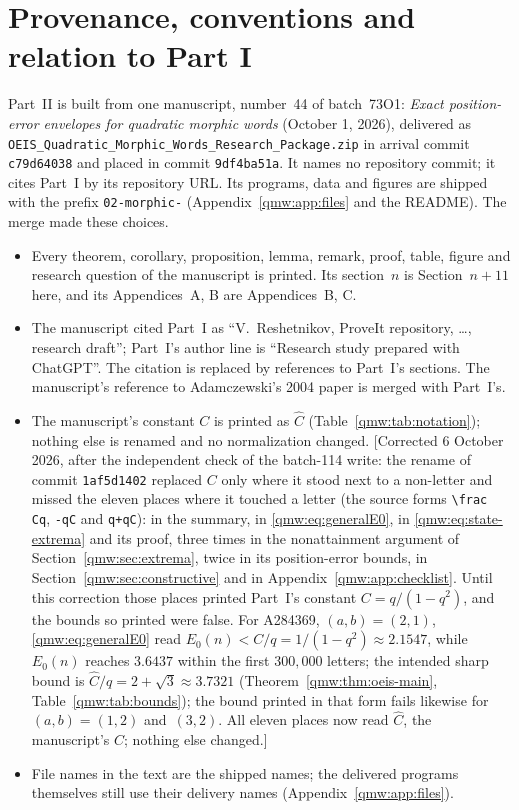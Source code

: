 \documentclass[11pt]{article}
\numberwithin{equation}{section}
\theoremstyle{definition}
\theoremstyle{remark}
\begin{document}
\section{Provenance, conventions and relation to Part I}
\label{qmw:sec:provenance}
Part~II is built from one manuscript, number~44 of batch~73O1:
\emph{Exact position-error envelopes for quadratic morphic words}
(October 1, 2026), delivered as
\texttt{OEIS\_\allowbreak Quadratic\_\allowbreak Morphic\_\allowbreak Words\_\allowbreak Research\_\allowbreak Package.zip} in arrival
commit \texttt{c79d64038} and placed in commit \texttt{9df4ba51a}. It names
no repository commit; it cites Part~I by its repository URL. Its programs,
data and figures are shipped with the prefix \texttt{02-morphic-}
(Appendix~\ref{qmw:app:files} and the README). The merge made these choices.
\begin{itemize}[leftmargin=*,itemsep=1pt]
\item Every theorem, corollary, proposition, lemma, remark, proof, table,
figure and research question of the manuscript is printed. Its section~$n$
is Section~$n+11$ here, and its Appendices~A, B are Appendices~B, C.
\item The manuscript cited Part~I as ``V.~Reshetnikov, ProveIt repository,
\dots, research draft''; Part~I's author line is ``Research study prepared
with ChatGPT''. The citation is replaced by references to Part~I's
sections. The manuscript's reference to Adamczewski's 2004 paper is merged
with Part~I's.
\item The manuscript's constant $C$ is printed as $\widehat C$
(Table~\ref{qmw:tab:notation}); nothing else is renamed and no
normalization changed. [Corrected 6 October 2026, after the independent
check of the batch-114 write: the rename of commit \texttt{1af5d1402}
replaced $C$ only where it stood next to a non-letter and missed the eleven
places where it touched a letter (the source forms \verb|\frac Cq|,
\verb|-qC| and \verb|q+qC|): in the summary, in \eqref{qmw:eq:generalE0}, in
\eqref{qmw:eq:state-extrema} and its proof, three times in the
nonattainment argument of Section~\ref{qmw:sec:extrema}, twice in its
position-error bounds, in Section~\ref{qmw:sec:constructive} and in
Appendix~\ref{qmw:app:checklist}. Until this correction those places
printed Part~I's constant $C=q/(1-q^2)$, and the bounds so printed were
false. For A284369, $(a,b)=(2,1)$, \eqref{qmw:eq:generalE0} read
$E_0(n)<C/q=1/(1-q^2)\approx2.1547$, while $E_0(n)$ reaches $3.6437$ within
the first $300{,}000$ letters; the intended sharp bound is
$\widehat C/q=2+\sqrt3\approx3.7321$ (Theorem~\ref{qmw:thm:oeis-main},
Table~\ref{qmw:tab:bounds}); the bound printed in that form fails likewise
for $(a,b)=(1,2)$ and~$(3,2)$. All eleven places now read $\widehat C$, the
manuscript's $C$; nothing else changed.]
\item File names in the text are the shipped names; the delivered programs
themselves still use their delivery names (Appendix~\ref{qmw:app:files}).
\end{itemize}
\end{document}
